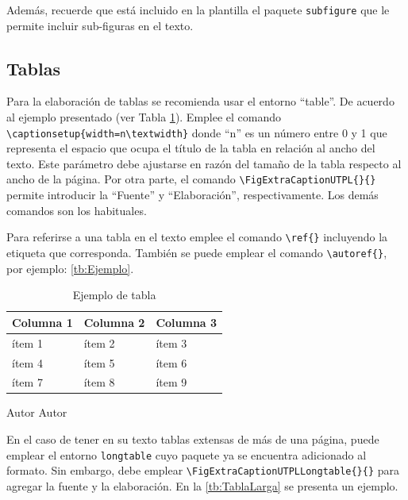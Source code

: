 Además, recuerde que está incluido en la plantilla el paquete \texttt{subfigure} que le permite incluir sub-figuras en el texto. 

\subsection{Tablas}
Para la elaboración de tablas se recomienda usar el entorno ``table''. De acuerdo al ejemplo presentado (ver Tabla \ref{tb:Ejemplo}). Emplee el comando \lstinline|\captionsetup{width=n\textwidth}| donde ``n'' es un número entre 0 y 1 que representa el espacio que ocupa el título de la tabla en relación al ancho del texto. Este parámetro debe ajustarse en razón del tamaño de la tabla respecto al ancho de la página. Por otra parte, el comando \lstinline|\FigExtraCaptionUTPL{}{}| permite introducir la ``Fuente'' y ``Elaboración'', respectivamente. Los demás comandos son los habituales. 

Para referirse a una tabla en el texto emplee el comando \lstinline|\ref{}| incluyendo la etiqueta que corresponda. También se puede emplear el comando \lstinline|\autoref{}|, por ejemplo: \autoref{tb:Ejemplo}.

\begin{table}[]
	\centering
	\captionsetup{width=0.44\textwidth}
	\caption{Ejemplo de tabla}
	\label{tb:Ejemplo}
	\begin{tabular}{|l|l|l|}
		\hline
		\textbf{Columna 1} & \textbf{Columna 2} & \textbf{Columna 3} \\ \hline
		ítem 1             & ítem 2             & ítem 3             \\ \hline
		ítem 4             & ítem 5             & ítem 6             \\ \hline
		ítem 7             & ítem 8             & ítem 9             \\ \hline
	\end{tabular}
	\vspace{3pt}
	\FigExtraCaptionUTPL		%
		{Autor}					%
		{Autor} 				%
\end{table}

En el caso de tener en su texto tablas extensas de más de una página, puede emplear el entorno \lstinline|longtable| cuyo paquete ya se encuentra adicionado al formato. Sin embargo, debe emplear \lstinline|\FigExtraCaptionUTPLLongtable{}{}| para agregar la fuente y la elaboración. En la \autoref{tb:TablaLarga} se presenta un ejemplo. 

